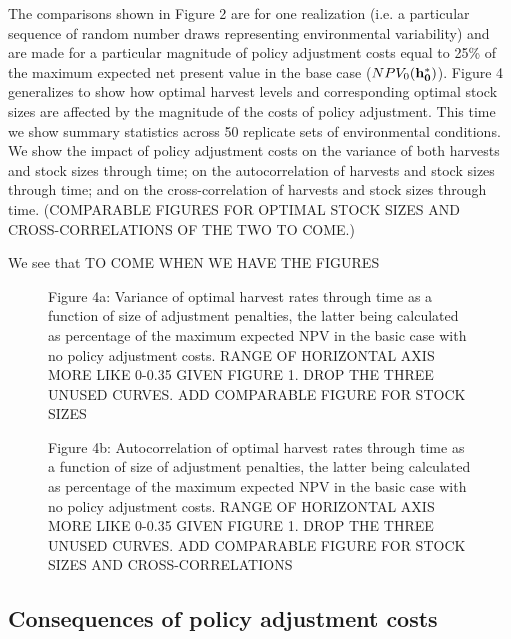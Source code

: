 \documentclass[12pt]{article}
\begin{document}
The comparisons shown in Figure 2 are for one realization (i.e. a particular sequence of random number draws representing environmental variability) and are made for a particular magnitude of policy adjustment costs equal to 25\% of the maximum expected net present value in the base case ($NPV_0({\bf h_0^*})$). Figure 4 generalizes to show how optimal harvest levels and corresponding optimal stock sizes are affected by the magnitude of the costs of policy adjustment. This time we show summary statistics across 50 replicate sets of environmental conditions. We show the impact of policy adjustment costs on the variance of both harvests and stock sizes through time; on the autocorrelation of harvests and stock sizes through time; and on the cross-correlation of harvests and stock sizes through time.  (COMPARABLE FIGURES FOR OPTIMAL STOCK SIZES AND CROSS-CORRELATIONS OF THE TWO TO COME.)

We see that TO COME WHEN WE HAVE THE FIGURES

\begin{figure}
\caption*{Figure 4a: Variance of optimal harvest rates through time as a function of size of adjustment penalties, the latter being calculated as percentage of the maximum expected NPV in the basic case with no policy adjustment costs. RANGE OF HORIZONTAL AXIS MORE LIKE 0-0.35 GIVEN FIGURE 1. DROP THE THREE UNUSED CURVES. ADD COMPARABLE FIGURE FOR STOCK SIZES}
\end{figure}

\begin{figure}
\caption*{Figure 4b: Autocorrelation of optimal harvest rates through time as a function of size of adjustment penalties, the latter being calculated as percentage of the maximum expected NPV in the basic case with no policy adjustment costs. RANGE OF HORIZONTAL AXIS MORE LIKE 0-0.35 GIVEN FIGURE 1. DROP THE THREE UNUSED CURVES. ADD COMPARABLE FIGURE FOR STOCK SIZES AND CROSS-CORRELATIONS}
\end{figure}

\subsection*{Consequences of policy adjustment costs}
\end{document}
